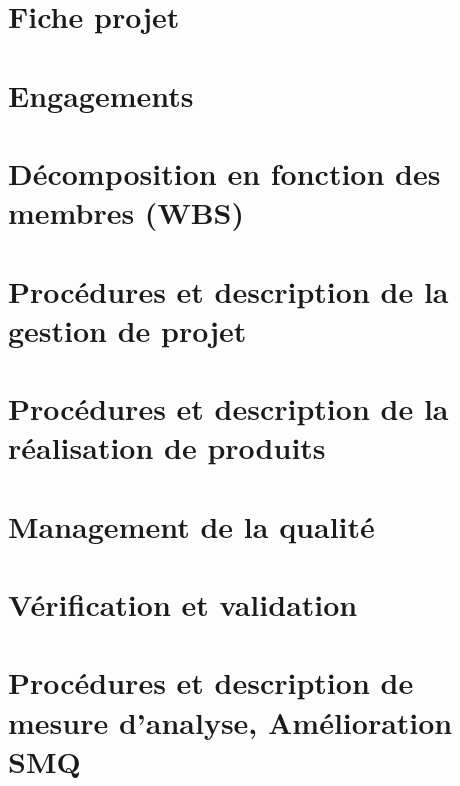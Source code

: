 \documentclass[asi]{picINSA}
\title{\PQ{}}
\author{\Pierre}
\begin{document}
\couverture{}

 \informationsGenerales{}


\tableofcontents

\setcounter{chapter}{0}
 
\chapter{Fiche projet}
\label{fiche_projet}


\chapter{Engagements}
\label{egagements}


\chapter{Décomposition en fonction des membres (WBS)}
\label{decomp_membre_WBS}


\chapter{Procédures et description de la gestion de projet}
\label{gestion_projet}


\chapter{Procédures et description de la réalisation de produits}
\label{realiser_les_produits}


\chapter{Management de la qualité}
\label{management_de_la_qualite}

 
\chapter{Vérification et validation}
\label{verification_et_validation}


\chapter{Procédures et description de mesure d'analyse, Amélioration SMQ}
\label{mesure_analyse_amelioration_SMQ}

\end{document}
